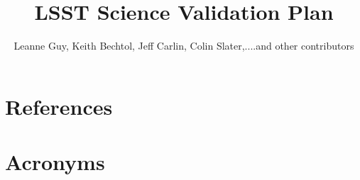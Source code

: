 \documentclass[DM,lsstdraft,toc]{lsstdoc}
\title{LSST Science Validation Plan}
\author{%
Leanne Guy, Keith Bechtol, Jeff Carlin, Colin Slater,....and other contributors
}
\date{\vcsDate}
\begin{document}
\maketitle




\appendix
\section{References} \label{sec:bib}
\renewcommand{\refname}{} %


\section{Acronyms} \label{sec:acronyms}

\end{document}
